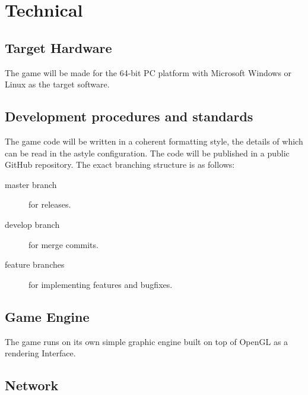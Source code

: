 \chapter{Technical}
\section{Target Hardware} %
The game will be made for the 64-bit PC platform with Microsoft Windows
or Linux as the target software.
\section{Development procedures and standards}
The game code will be written in a coherent formatting style, the details of
which can be read in the astyle configuration. %
The code will be published in a public GitHub repository. The exact branching
structure is as follows:
\begin{description}
    \item[master branch] for releases.
    \item[develop branch] for merge commits.
    \item[feature branches] for implementing features and bugfixes.
\end{description}
\section{Game Engine}
The game runs on its own simple graphic engine built on top of OpenGL as a
rendering Interface. %
\section{Network} %
